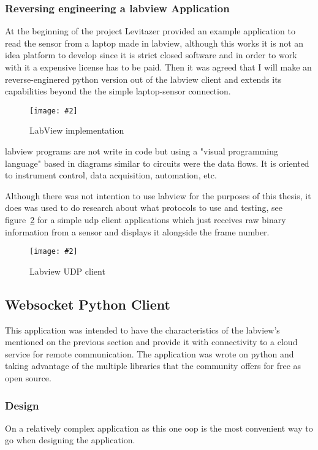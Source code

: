 \documentclass[hidelinks,11pt,a4paper,oneside,article]{memoir}
\newcommand{\putimage}[3][10] %
{
\begin{figure}[h]
	\centering
	\captionsetup{justification=centering}
	\texttt{[image: \#2]}
	\caption{#3}
	\label{fig:#2}
\end{figure}
}
\begin{document}
\subsubsection{Reversing engineering a \gls{labview} Application}
At the beginning of the project Levitazer provided an example application to read the sensor from a laptop made in \gls{labview}, although this works it is not an idea platform to develop since it is strict closed software and in order to work with it a expensive license has to be paid. Then it was agreed that I will make an reverse-enginered python version out of the \gls{labview} client and extends its capabilities beyond the the simple laptop-sensor connection.

    \putimage{labview}{LabView implementation}
    
\gls{labview} programs are not write in code but using a "visual programming language" based in diagrams similar to circuits were the data flows. It is oriented to instrument control, data acquisition, automation, etc.~\cite{labview}

Although there was not intention to use \gls{labview} for the purposes of this thesis, it does was used to do research about what protocols to use and testing, see figure~\ref{fig:labview-udp} for a simple \gls{udp} client applications which just receives raw binary information from a sensor and displays it alongside the frame number.

    \putimage{labview-udp}{Labview UDP client}

\subsection{Websocket Python Client}\label{sec:websocket-python-client}
This application was intended to have the characteristics of the \gls{labview}'s mentioned on the previous section and provide it with connectivity to a cloud service for remote communication. The application was wrote on python and taking advantage of the multiple libraries that the community offers for free as open source. %


\subsubsection{Design}
On a relatively complex application as this one  \gls{oop} is the most convenient way to go when designing the application.
\end{document}
